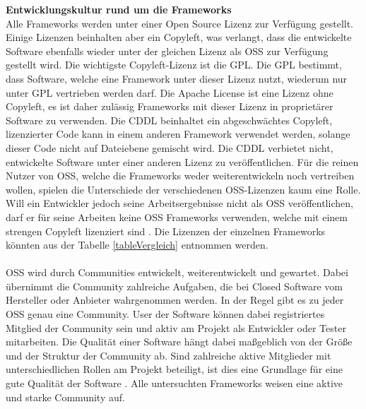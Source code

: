 \textbf{Entwicklungskultur rund um die Frameworks}\\
Alle Frameworks werden unter einer Open Source Lizenz zur Verfügung gestellt. Einige Lizenzen beinhalten aber ein Copyleft, was verlangt, dass die entwickelte Software ebenfalls wieder unter der gleichen Lizenz als \acrfull{OSS} zur Verfügung gestellt wird. Die wichtigste Copyleft-Lizenz ist die \acrfull{GPL}. Die GPL bestimmt, dass Software, welche eine Framework unter dieser Lizenz nutzt, wiederum nur unter GPL vertrieben werden darf. Die Apache License ist eine Lizenz ohne Copyleft, es ist daher zulässig Frameworks mit dieser Lizenz in proprietärer Software zu verwenden. Die \acrfull{CDDL} beinhaltet ein abgeschwächtes Copyleft, lizenzierter Code kann in einem anderen Framework verwendet werden, solange dieser Code nicht auf Dateiebene gemischt wird. Die CDDL verbietet nicht, entwickelte Software unter einer anderen Lizenz zu veröffentlichen. Für die reinen Nutzer von OSS, welche die Frameworks weder weiterentwickeln noch vertreiben wollen, spielen die Unterschiede der verschiedenen OSS-Lizenzen kaum eine Rolle. Will ein Entwickler jedoch seine Arbeitsergebnisse nicht als OSS veröffentlichen, darf er für seine Arbeiten keine OSS Frameworks verwenden, welche mit einem strengen Copyleft lizenziert sind \cite{openSource}. Die Lizenzen der einzelnen Frameworks könnten aus der Tabelle \ref{tableVergleich} entnommen werden.
\\\\
OSS wird durch Communities entwickelt, weiterentwickelt und gewartet. Dabei übernimmt die Community zahlreiche Aufgaben, die bei Closed Software vom Hersteller oder Anbieter wahrgenommen werden. In der Regel gibt es zu jeder OSS genau eine Community. User der Software können dabei registriertes Mitglied der Community sein und aktiv am Projekt als Entwickler oder Tester mitarbeiten. Die Qualität einer Software hängt dabei maßgeblich von der Größe und der Struktur der Community ab. Sind zahlreiche aktive Mitglieder mit unterschiedlichen Rollen am Projekt beteiligt, ist dies eine Grundlage für eine gute Qualität der Software \cite{openSource:community}. Alle untersuchten Frameworks weisen eine aktive und starke Community auf.
\\\\
